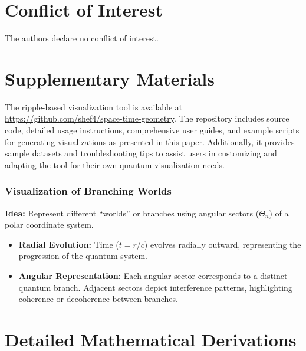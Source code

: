 \documentclass[12pt]{article}
\begin{document}
\section*{Conflict of Interest}
The authors declare no conflict of interest.

\section*{Supplementary Materials}
The ripple-based visualization tool is available at \url{https://github.com/shef4/space-time-geometry}. The repository includes source code, detailed usage instructions, comprehensive user guides, and example scripts for generating visualizations as presented in this paper. Additionally, it provides sample datasets and troubleshooting tips to assist users in customizing and adapting the tool for their own quantum visualization needs.

\appendix




















\subsubsection{Visualization of Branching Worlds}

\textbf{Idea:} Represent different “worlds” or branches using angular sectors (\(\Theta_n\)) of a polar coordinate system. 

\begin{itemize}
    \item \textbf{Radial Evolution:} Time (\(t = r/c\)) evolves radially outward, representing the progression of the quantum system. 
    \item \textbf{Angular Representation:} Each angular sector corresponds to a distinct quantum branch. Adjacent sectors depict interference patterns, highlighting coherence or decoherence between branches.
\end{itemize}



\section{Detailed Mathematical Derivations}
\label{appendix:A}
\end{document}

